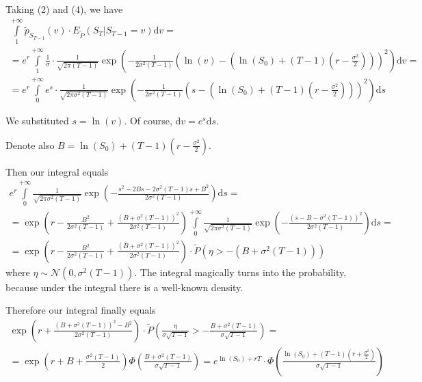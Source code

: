 \documentclass[12pt, a4paper]{article}
\newcommand{\ds}{\displaystyle}
\newcommand{\dv}{\mathrm{d}v}
\begin{document}
Taking (2) and (4), we have
\begin{multline}
 \int\limits_{1}^{+\infty}\tilde{p}_{S_{T-1}}(v)\cdot E_{\tilde{P}}\left(S_{T} | S_{T-1} = v\right)\dv =\\
 = e^{r}\int\limits_{1}^{+\infty}\frac{\ds 1}{\ds \sigma}\cdot \frac{\ds 1}{\ds \sqrt{2\pi (T-1)}}\exp\left(-\frac{\ds 1}{\ds 2\sigma^{2}(T-1)}\left(\ln(v) - \left(\ln(S_{0}) + (T-1)\left(r - \frac{\ds \sigma^{2}}{\ds 2}\right)\right)\right)^{2}\right)\dv = \\
 = e^{r}\int\limits_{0}^{+\infty}e^{s}\cdot \frac{\ds 1}{\ds \sqrt{2\pi\sigma^{2} (T-1)}}\exp\left(-\frac{\ds 1}{\ds 2\sigma^{2}(T-1)}\left(s - \left(\ln(S_{0}) + (T-1)\left(r - \frac{\ds \sigma^{2}}{\ds 2}\right)\right)\right)^{2}\right)\mathrm{d}s
\end{multline}

We substituted $s = \ln(v)$. Of course, $\dv = e^{s}\mathrm{d}s$.\par
Denote also $B = \ln(S_{0}) + (T-1)\left(r - \frac{\ds \sigma^{2}}{\ds 2}\right)$.\par
Then our integral equals
\begin{multline}
e^{r}\int\limits_{0}^{+\infty} \frac{\ds 1}{\ds \sqrt{2\pi\sigma^{2} (T-1)}}\exp\left(-\frac{\ds s^{2} - 2Bs - 2\sigma^{2}(T-1)s + B^{2}}{\ds 2\sigma^{2}(T-1)}\right)\mathrm{d}s = \\
= \exp\left(r - \frac{\ds B^{2}}{\ds 2\sigma^{2}(T-1)} + \frac{\ds \left(B + \sigma^{2}(T-1)\right)^{2}}{\ds 2\sigma^{2}(T-1)}\right)\int\limits_{0}^{+\infty} \frac{\ds 1}{\ds \sqrt{2\pi\sigma^{2} (T-1)}}\exp\left(-\frac{\ds \left(s - B - \sigma^{2}(T-1)\right)^{2}}{\ds 2\sigma^{2}(T-1)}\right)\mathrm{d}s = \\
= \exp\left(r - \frac{\ds B^{2}}{\ds 2\sigma^{2}(T-1)} + \frac{\ds \left(B + \sigma^{2}(T-1)\right)^{2}}{\ds 2\sigma^{2}(T-1)}\right) \cdot \tilde{P}\left(\eta > -\left(B + \sigma^{2}(T-1)\right)\right)
\end{multline}
where $\eta \sim \mathcal{N}(0, \sigma^{2}(T-1))$. The integral magically turns into the probability, because under the integral there is a well-known density.


Therefore our integral finally equals
\begin{multline}
 \exp\left(r + \frac{\ds \left(B + \sigma^{2}(T-1)\right)^{2} - B^{2}}{\ds 2\sigma^{2}(T-1)}\right)\cdot \tilde{P}\left(\frac{\ds \eta}{\ds \sigma\sqrt{T-1}} > -\frac{\ds B + \sigma^{2}(T-1)}{\ds \sigma\sqrt{T-1}}\right) = \\
=
\exp\left(r + B + \frac{\ds \sigma^{2}(T-1)}{\ds 2}\right)\Phi\left(\frac{\ds B + \sigma^{2}(T-1)}{\ds \sigma\sqrt{T-1}}\right) = e^{\ln(S_{0}) + rT}\cdot\Phi\left(\frac{\ds \ln(S_{0}) + (T-1)\left(r + \frac{\ds \sigma^{2}}{\ds 2}\right)}{\ds \sigma\sqrt{T-1}}\right)
\end{multline}
\end{document}
